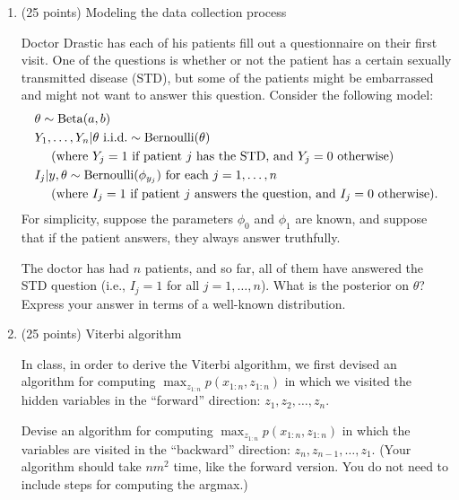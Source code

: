\documentclass[12pt]{article}
\begin{document}
\begin{enumerate}
\newpage
\item (25 points) Modeling the data collection process

Doctor Drastic has each of his patients fill out a questionnaire on their first visit. One of the questions is whether or not the patient has a certain sexually transmitted disease (STD), but some of the patients might be embarrassed and might not want to answer this question. Consider the following model:
\begin{align*}
& \theta \sim \operatorname*{Beta}(a,b) \\
& Y_1,\ldots,Y_n | \theta \text{ i.i.d.} \sim \operatorname*{Bernoulli}(\theta) \\
&~~~~\text{(where $Y_j = 1$ if patient $j$ has the STD, and $Y_j = 0$ otherwise)}\\
& I_j | y,\theta \sim \operatorname*{Bernoulli}(\phi_{y_j}) \text{ for each $j = 1,\ldots,n$}\\
&~~~~\text{(where $I_j = 1$ if patient $j$ answers the question, and $I_j = 0$ otherwise)}.
\end{align*}
For simplicity, suppose the parameters $\phi_0$ and $\phi_1$ are known, and suppose that if the patient answers, they always answer truthfully.  

The doctor has had $n$ patients, and so far, all of them have answered the STD question (i.e., $I_j = 1$ for all $j = 1,\ldots,n$). What is the posterior on $\theta$?  Express your answer in terms of a well-known distribution.


\newpage
\item (25 points) Viterbi algorithm

In class, in order to derive the Viterbi algorithm, we first devised an algorithm for computing $\max_{z_{1:n}} p(x_{1:n},z_{1:n})$ in which we visited the hidden variables in the ``forward'' direction: $z_1,z_2,\ldots,z_n$.

Devise an algorithm for computing $\max_{z_{1:n}} p(x_{1:n},z_{1:n})$ in which the variables are visited in the ``backward'' direction: $z_n,z_{n -1},\ldots,z_1$.  (Your algorithm should take $n m^2$ time, like the forward version. You do not need to include steps for computing the argmax.)






    
\end{enumerate}
\end{document}

